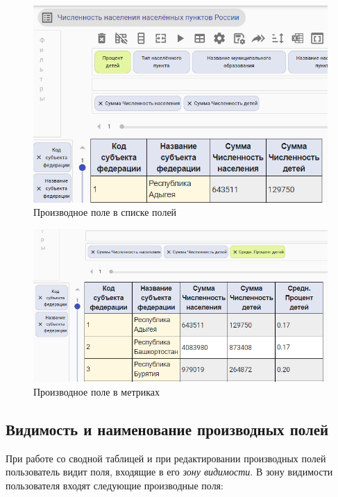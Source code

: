 \documentclass[../user-manual.tex]{subfiles}
\begin{document}
	\begin{figure}[h]
		\centering
		\includegraphics[width=\graphicswidth]{img/9-deriver-field.png}
		\caption{Производное поле в списке полей}
		\label{fig:derived-field-2}
	\end{figure}

	\begin{figure}[h]
		\centering
		\includegraphics[width=\graphicswidth]{img/10-deriver-field.png}
		\caption{Производное поле в метриках}
		\label{fig:derived-field-3}
	\end{figure}
	
	\subsection{Видимость и наименование производных полей}
	
	При работе со сводной таблицей и при редактировании производных полей пользователь видит поля, входящие в его \textit{зону видимости}. В зону видимости пользователя входят следующие производные поля:
	
\end{document}
